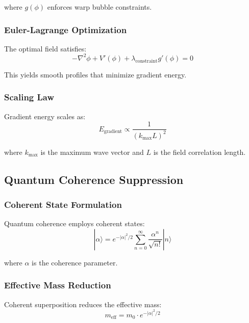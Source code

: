 where $g(\phi)$ enforces warp bubble constraints.

\subsubsection{Euler-Lagrange Optimization}

The optimal field satisfies:
\begin{equation}
-\nabla^2 \phi + V'(\phi) + \lambda_{\text{constraint}} g'(\phi) = 0
\end{equation}

This yields smooth profiles that minimize gradient energy.

\subsubsection{Scaling Law}

Gradient energy scales as:
\begin{equation}
E_{\text{gradient}} \propto \frac{1}{(k_{\max} L)^2}
\end{equation}

where $k_{\max}$ is the maximum wave vector and $L$ is the field correlation length.

\subsection{Quantum Coherence Suppression}

\subsubsection{Coherent State Formulation}

Quantum coherence employs coherent states:
\begin{equation}
|\alpha\rangle = e^{-|\alpha|^2/2} \sum_{n=0}^{\infty} \frac{\alpha^n}{\sqrt{n!}} |n\rangle
\end{equation}

where $\alpha$ is the coherence parameter.

\subsubsection{Effective Mass Reduction}

Coherent superposition reduces the effective mass:
\begin{equation}
m_{\text{eff}} = m_0 \cdot e^{-|\alpha|^2/2}
\end{equation}

